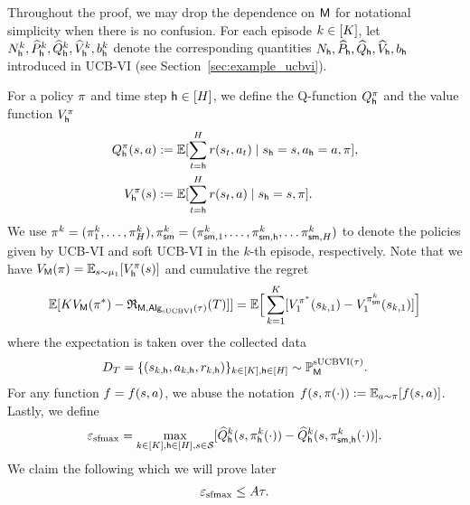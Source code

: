 Throughout the proof, we may drop the dependence on ${\mathsf{M}}$ for notational simplicity when there is no confusion. For each episode $k\in[{K}]$, let ${N}^k_{\mathsf{h}},\widehat{P}^k_{\mathsf{h}},{\widehat{{Q}}}^k_{\mathsf{h}},{\widehat{{{V}}}}^k_{\mathsf{h}},{b}^k_{\mathsf{h}}$ denote the corresponding quantities ${N}_{\mathsf{h}},\widehat{P}_{\mathsf{h}},{\widehat{{Q}}}_{\mathsf{h}},{\widehat{{{V}}}}_{\mathsf{h}},{b}_{\mathsf{h}}$  introduced in UCB-VI (see Section~\ref{sec:example_ucbvi}).

For a policy ${\pi}$ and time step ${\mathsf{h}}\in[{H}]$, we define the Q-function ${Q}_{\mathsf{h}}^{\pi}$ and the value function ${{V}}_{\mathsf{h}}^{\pi}$
\begin{align*}
{Q}_{\mathsf{h}}^{\pi}({s},{a})&:=\mathbb{E}[\sum_{t={\mathsf{h}}}^{H} {r}({s}_t,{a}_t)\mid {s}_{\mathsf{h}}={s},{a}_{\mathsf{h}}={a},{\pi}],\\
{{V}}_{\mathsf{h}}^{\pi}({s})&:=\mathbb{E}[\sum_{t={\mathsf{h}}}^{H} {r}({s}_t,{a})\mid {s}_{\mathsf{h}}={s},{\pi}].
\end{align*}
 We use ${\pi}^{k}=({\pi}^k_1,\ldots,{\pi}^k_{H}),{\pi}^k_{{\mathsf{sm}}}=({\pi}^k_{{\mathsf{sm}},1},\ldots,{\pi}^k_{{\mathsf{sm}},{\mathsf{h}}},\ldots{\pi}^k_{{\mathsf{sm}},{H}})$ to denote the policies given by UCB-VI and soft UCB-VI in the $k$-th episode, respectively. Note that we have ${{V}}_{\mathsf{M}}({\pi})=\mathbb{E}_{{s}\sim{\mu_1}}[{{V}}_{\mathsf{h}}^{\pi}({s})]$ and cumulative the regret
 $$
 \mathbb{E}[{K}{{V}}_{\mathsf{M}}({\pi}^*)-{\mathfrak{R}}_{{\mathsf{M}},{\mathsf{Alg}}_{\mathrm{sUCBVI}}({\tau})}({T})]]=\mathbb{E}\Big[\sum_{k=1}^{{K}}[{{V}}_1^{{\pi^*}}({s}_{k,1})-{{V}}_1^{{\pi}^k_{{\mathsf{sm}}}}({s}_{k,1})
 ]\Big]
 $$
 where the expectation is taken over the collected data $${D}_{T}=\{({s}_{k,{\mathsf{h}}},{a}_{k,{\mathsf{h}}},{r}_{k,{\mathsf{h}}})\}_{k\in[{K}],{\mathsf{h}}\in[{H}]}\sim\mathbb{P}_{\mathsf{M}}^{{\mathrm{sUCBVI}}({\tau})}.$$
 For any function $f=f({s},{a})$, we abuse the notation $f({s},{\pi}(
\cdot)):=\mathbb{E}_{{a}\sim{\pi}}[f({s},{a})]$. Lastly, we define
\begin{align*}
{\varepsilon_{\mathrm{sfmax}}}=\max_{k\in[{K}],{\mathsf{h}}\in[{H}],{s}\in{\mathcal{S}}}[{\widehat{{Q}}}^k_{\mathsf{h}}({s},{\pi}^k_{{\mathsf{h}}}(\cdot))-{\widehat{{Q}}}^k_{\mathsf{h}}({s},{\pi}^k_{{\mathsf{sm}},{\mathsf{h}}}(\cdot)) ].
\end{align*}
We claim the following which we will prove later
\begin{align}\label{eq:epstemp_control}
  {\varepsilon_{\mathrm{sfmax}}}\leq {A}{\tau}.
\end{align}

